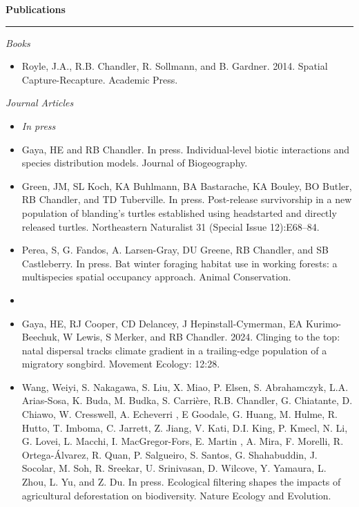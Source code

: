 \documentclass[12pt]{article}
\begin{document}
\vspace{0.5cm}

{\large \bf Publications} \\
\rule[3mm]{\textwidth}{0.3mm}

\emph{Books}
\begin{itemize}

\item Royle, J.A., R.B. Chandler, R. Sollmann, and B. Gardner. 2014. Spatial
Capture-Recapture. Academic Press. 

\end{itemize}

\vspace{0.5cm}

\emph{Journal Articles}

\begin{itemize}

\item[] {\centering \it In press \\}

\item Gaya, HE and RB Chandler. In press. Individual‐level biotic
  interactions and species distribution models. Journal of
  Biogeography.  

\item Green, JM, SL Koch, KA Buhlmann, BA Bastarache, KA Bouley, BO
  Butler, RB Chandler, and TD Tuberville. In press. Post-release
  survivorship in a new population of blanding’s turtles established
  using headstarted and directly released turtles. Northeastern
  Naturalist 31 (Special Issue 12):E68--84.   

\item Perea, S, G. Fandos, A. Larsen-Gray, DU Greene, RB Chandler, and
  SB Castleberry. In press. Bat winter foraging habitat use in working
  forests: a multispecies spatial occupancy approach. Animal
  Conservation.  

\item[] { \\}

\item  Gaya, HE, RJ Cooper, CD Delancey, J Hepinstall-Cymerman, EA
  Kurimo-Beechuk, W Lewis, S Merker, and RB Chandler. 2024. Clinging
  to the top: natal dispersal tracks climate gradient in a
  trailing-edge population of a migratory songbird. Movement
  Ecology: 12:28.  

\item Wang, Weiyi, S. Nakagawa, S. Liu, X. Miao, P. Elsen,
  S. Abrahamczyk, L.A. Arias-Sosa, K. Buda, M. Budka, S. Carri\`{e}re,
  R.B. Chandler, G. Chiatante, D. Chiawo, W. Cresswell, A. Echeverri ,
  E Goodale, G. Huang, M. Hulme, R. Hutto, T. Imboma, C. Jarrett,
  Z. Jiang, V. Kati, D.I. King, P. Kmecl, N. Li, G. Lovei, L. Macchi,
  I. MacGregor-Fors, E. Martin , A. Mira, F. Morelli,
  R. Ortega-\'{A}lvarez, R. Quan, P. Salgueiro, S. Santos,
  G. Shahabuddin, J. Socolar, M. Soh, R. Sreekar, U. Srinivasan,
  D. Wilcove, Y. Yamaura, L. Zhou, L. Yu, and Z. Du. In
  press. Ecological filtering shapes the impacts of agricultural
  deforestation on biodiversity. Nature Ecology and Evolution. 


\end{itemize}
\end{document}
